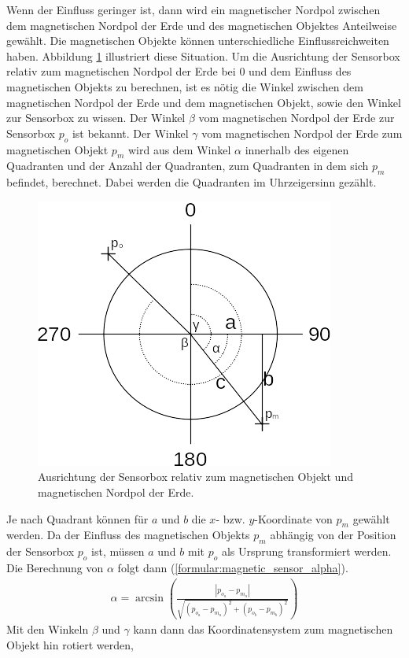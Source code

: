 Wenn der Einfluss geringer ist, dann wird ein magnetischer Nordpol zwischen dem magnetischen Nordpol der Erde und des magnetischen Objektes Anteilweise gewählt.
Die magnetischen Objekte können unterschiedliche Einflussreichweiten haben.
\newline
\newline
Abbildung \ref{fig:magnetic_model} illustriert diese Situation.
Um die Ausrichtung der Sensorbox relativ zum magnetischen Nordpol der Erde bei 0 und dem Einfluss des magnetischen Objekts zu berechnen,
ist es nötig die Winkel zwischen dem magnetischen Nordpol der Erde und dem magnetischen Objekt, sowie den Winkel zur Sensorbox zu wissen.
Der Winkel $\beta$ vom magnetischen Nordpol der Erde zur Sensorbox $p_{o}$ ist bekannt.
Der Winkel $\gamma$ vom magnetischen Nordpol der Erde zum magnetischen Objekt $p_{m}$ wird aus dem Winkel $\alpha$ innerhalb des eigenen Quadranten
und der Anzahl der Quadranten, zum Quadranten in dem sich $p_{m}$ befindet, berechnet.
Dabei werden die Quadranten im Uhrzeigersinn gezählt.
\begin{figure}[h!]
    \centering
    \includegraphics[width=0.5\linewidth]{images/magnetic_model.png}
    \caption{Ausrichtung der Sensorbox relativ zum magnetischen Objekt und magnetischen Nordpol der Erde.}
    \label{fig:magnetic_model}
\end{figure}
Je nach Quadrant können für $a$ und $b$ die $x$- bzw. $y$-Koordinate von $p_{m}$ gewählt werden.
Da der Einfluss des magnetischen Objekts $p_{m}$ abhängig von der Position der Sensorbox $p_{o}$ ist,
müssen $a$ und $b$ mit $p_{o}$ als Ursprung transformiert werden.
Die Berechnung von $\alpha$ folgt dann (\ref{formular:magnetic_sensor_alpha}).
\begin{align}
    \label{formular:magnetic_sensor_alpha}
    \alpha = \arcsin (\frac{|p_{o_a} - p_{m_a}|}{\sqrt{(p_{o_a} - p_{m_a})^2 + (p_{o_b} - p_{m_b})^2}})
\end{align}
Mit den Winkeln $\beta$ und $\gamma$ kann dann das Koordinatensystem zum magnetischen Objekt hin rotiert werden,
